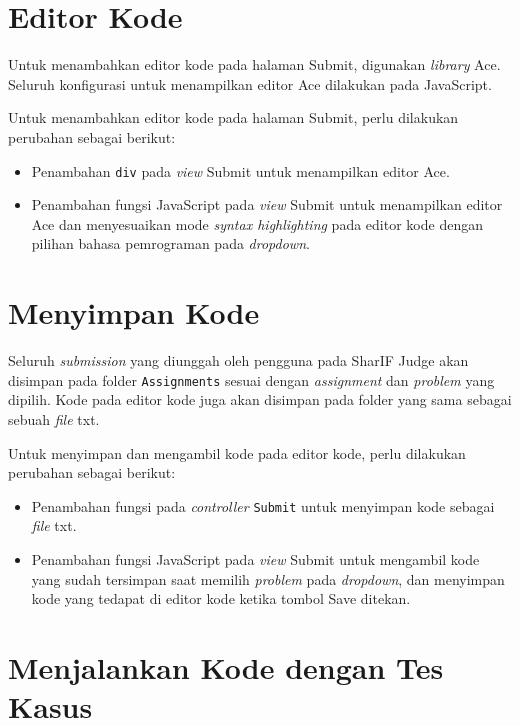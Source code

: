 \section{Editor Kode}
\label{sec:4:editor}

Untuk menambahkan editor kode pada halaman Submit, digunakan \textit{library} Ace. Seluruh konfigurasi untuk menampilkan editor Ace dilakukan pada JavaScript.

Untuk menambahkan editor kode pada halaman Submit, perlu dilakukan perubahan sebagai berikut:
\begin{itemize}
    \item Penambahan \verb|div| pada \textit{view} Submit untuk menampilkan editor Ace.
    \item Penambahan fungsi JavaScript pada \textit{view} Submit untuk menampilkan editor Ace dan menyesuaikan mode \textit{syntax highlighting} pada editor kode dengan pilihan bahasa pemrograman pada \textit{dropdown}.
\end{itemize}

\section{Menyimpan Kode}
\label{sec:4:simpan}

Seluruh \textit{submission} yang diunggah oleh pengguna  pada SharIF Judge akan disimpan pada folder \verb|Assignments| sesuai dengan \textit{assignment} dan \textit{problem} yang dipilih. Kode pada editor kode juga akan disimpan pada folder yang sama sebagai sebuah \textit{file} txt. 

Untuk menyimpan dan mengambil kode pada editor kode, perlu dilakukan perubahan sebagai berikut:
\begin{itemize}
    \item Penambahan fungsi pada \textit{controller} \verb|Submit| untuk menyimpan kode sebagai \textit{file} txt.
    \item Penambahan fungsi JavaScript pada \textit{view} Submit untuk mengambil kode yang sudah tersimpan saat memilih \textit{problem} pada \textit{dropdown}, dan menyimpan kode yang tedapat di editor kode ketika tombol Save ditekan.
\end{itemize}

\section{Menjalankan Kode dengan Tes Kasus}
\label{sec:4:jalan}


